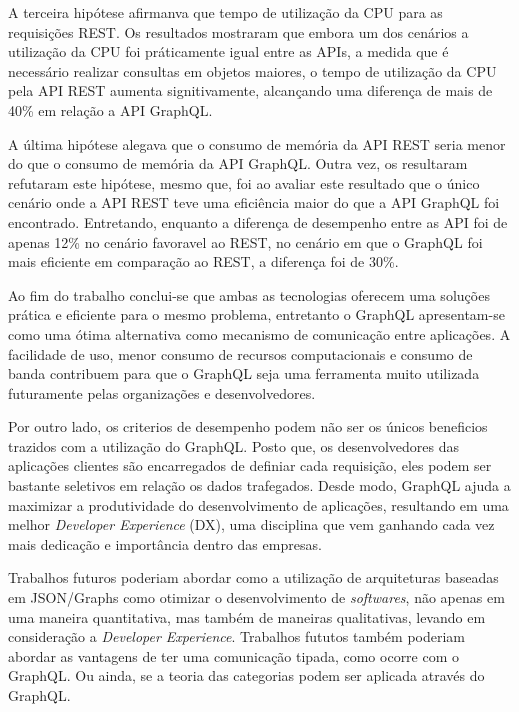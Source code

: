A terceira hipótese afirmanva que tempo de utilização da CPU para as requisições REST. Os resultados mostraram que embora um dos cenários a utilização da CPU foi práticamente igual entre as APIs, a medida que é necessário realizar consultas em objetos maiores, o tempo de utilização da CPU pela API REST aumenta signitivamente, alcançando uma diferença de mais de 40\% em relação a API GraphQL. 

A última hipótese alegava que o consumo de memória da API REST seria menor do que o consumo de memória da API GraphQL. Outra vez, os resultaram refutaram este hipótese, mesmo que, foi ao avaliar este resultado que o único cenário onde a API REST teve uma eficiência maior do que a API GraphQL foi encontrado. Entretando, enquanto a diferença de desempenho entre as API foi de apenas 12\% no cenário favoravel ao REST, no cenário em que o GraphQL foi mais eficiente em comparação ao REST, a diferença foi de 30\%. 

Ao fim do trabalho conclui-se que ambas as tecnologias oferecem uma soluções prática e eficiente para o mesmo problema, entretanto o GraphQL apresentam-se como uma ótima alternativa como mecanismo de comunicação entre aplicações. A facilidade de uso, menor consumo de recursos computacionais e consumo de banda contribuem para que o GraphQL seja uma ferramenta muito utilizada futuramente pelas organizações e desenvolvedores. 

Por outro lado, os criterios de desempenho podem não ser os únicos beneficios trazidos com a utilização do GraphQL. Posto que, os desenvolvedores das aplicações clientes são encarregados de definiar cada requisição, eles podem ser bastante seletivos em relação os dados trafegados. Desde modo, GraphQL ajuda a maximizar a produtividade do desenvolvimento de aplicações, resultando em uma melhor \textit{Developer Experience} (DX), uma disciplina que vem ganhando cada vez mais dedicação e importância dentro das empresas.

Trabalhos futuros poderiam abordar como a utilização de arquiteturas baseadas em JSON/Graphs como otimizar o desenvolvimento de \textit{softwares}, não apenas em uma maneira quantitativa, mas também de maneiras qualitativas, levando em consideração a \textit{Developer Experience}. Trabalhos fututos também poderiam abordar as vantagens de ter uma comunicação tipada, como ocorre com o GraphQL. Ou ainda, se a teoria das categorias podem ser aplicada através do GraphQL.
